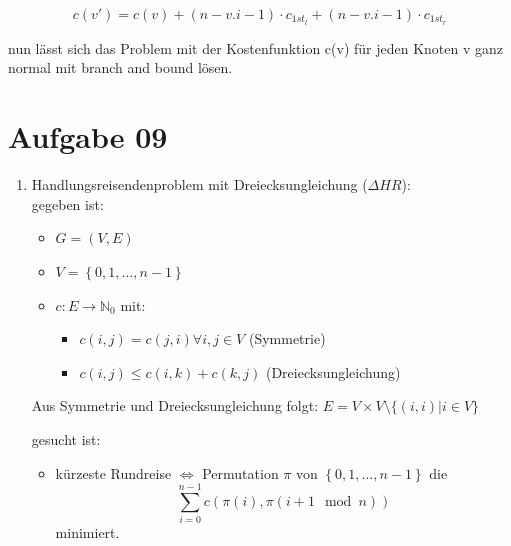 \documentclass[10pt,a4paper]{article}
\begin{document}
    $$
        c(v') = c(v) + (n-v.i-1) \cdot c_{1st_l} + (n-v.i-1) \cdot c_{1st_r}
    $$

    nun l\"asst sich das Problem mit der Kostenfunktion c(v) f\"ur jeden
    Knoten v ganz normal mit branch and bound l\"osen.




\section*{Aufgabe 09}
    \begin{enumerate}[label={\alph*)}]
        \item Handlungsreisendenproblem mit Dreiecksungleichung ($\Delta HR$): \\
            gegeben ist:
            \begin{itemize}
                \item $G = (V,E)$
                \item $V = \left\{0,1,\ldots, n-1\right\}$
                \item $c: E \rightarrow \mathbb{N}_0 $ mit:
                    \begin{itemize}
                        \item $c(i,j) = c(j,i) \forall i,j \in V$ (Symmetrie)
                        \item $c(i,j) \leq c(i,k) + c(k,j)$ (Dreiecksungleichung)
                    \end{itemize}

            \end{itemize}

            Aus Symmetrie und Dreiecksungleichung folgt: $E = V \times V
            \setminus \{ (i,i) | i \in V \} $

            gesucht ist:
            \begin{itemize}
                \item kürzeste Rundreise $\Leftrightarrow$
                    Permutation $\pi$ von $\left\{0,1,\ldots, n-1\right\}$ die
                    $$
                        \sum_{i=0}^{n-1} c(\pi(i), \pi(i+1 \mod n))
                    $$
                    minimiert.
            \end{itemize}


\end{enumerate}
\end{document}
